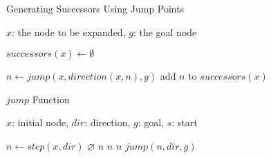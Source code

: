 \begin{algorithm}[b]
\caption{Generating Successors Using Jump Points}
\label{alg:successors}
\begin{algorithmic}[1]
\REQUIRE $x$: the node to be expanded, $g$: the goal node 

\STATE $successors(x) \leftarrow \emptyset$

\STATE $n \leftarrow jump(x, direction(x, n), g)$
\STATE add $n$ to $successors(x)$
\ENDFOR

\end{algorithmic}
\end{algorithm}

\begin{algorithm}[b]
\caption{$jump$ Function}
\label{alg:jump}
\begin{algorithmic}[1]
\REQUIRE $x$: initial node, $dir$: direction, $g$: goal, $s$: start

\STATE $n \leftarrow step(x, dir)$
	\RETURN $\varnothing$
\ENDIF
{}
	\RETURN $n$
\ENDIF
{}
	\RETURN $n$
\ENDIF
{}
			\RETURN $n$
		\ENDIF
	\ENDFOR
\ENDIF
\RETURN $jump(n, dir, g)$
\end{algorithmic}
\end{algorithm}
